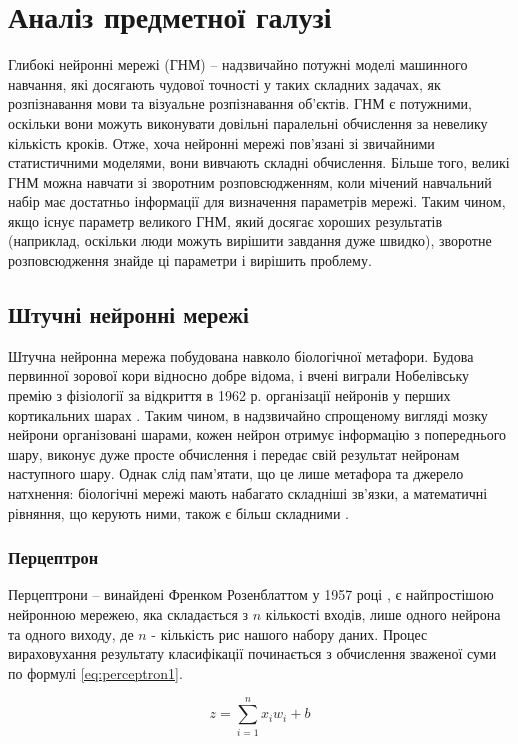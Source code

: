 \documentclass[a4paper,14pt]{extreport}
\begin{document}
\section{Аналіз предметної галузі}
Глибокі нейронні мережі (ГНМ) -- надзвичайно потужні моделі машинного навчання,
які досягають чудової точності у таких складних задачах, як
розпізнавання мови та візуальне розпізнавання об’єктів.
ГНМ є потужними, оскільки вони можуть виконувати
довільні паралельні обчислення за невелику кількість кроків.
Отже, хоча нейронні мережі пов’язані
зі звичайними статистичними моделями, вони вивчають складні
обчислення. Більше того, великі ГНМ можна навчати зі
зворотним розповсюдженням, коли мічений навчальний набір має
достатньо інформації для визначення параметрів мережі. Таким
чином, якщо існує параметр великого ГНМ, який досягає хороших
результатів (наприклад, оскільки люди можуть вирішити завдання
дуже швидко), зворотне розповсюдження знайде ці
параметри і вирішить проблему.

\subsection{Штучні нейронні мережі}
Штучна нейронна мережа побудована навколо біологічної метафори.
Будова первинної зорової кори відносно добре відома,
і вчені виграли Нобелівську премію з фізіології за відкриття в
1962 р. організації нейронів у перших кортикальних
шарах \cite{cortex-stuff}. Таким чином, в надзвичайно
спрощеному вигляді
мозку нейрони організовані шарами, кожен нейрон отримує
інформацію з попереднього шару, виконує дуже просте
обчислення і передає свій результат нейронам наступного
шару. Однак слід пам’ятати, що це лише метафора та джерело
натхнення: біологічні мережі мають набагато складніші
зв’язки, а математичні рівняння, що керують ними, також
є більш складними \cite{cortex-equations}.

\subsubsection{Перцептрон}
Перцептрони -- винайдені Френком Розенблаттом у 1957 році
\cite{rozenblatt}, є найпростішою
нейронною мережею, яка складається з $n$ кількості входів, лише одного
нейрона та одного виходу, де $n$ - кількість рис нашого набору
даних. Процес вираховухання результату класифікації починається
з обчислення зваженої суми
по формулі \ref{eq:perceptron1}.

\begin{equation}
    z = \sum^n_{i=1} x_i w_i + b
    \label{eq:perceptron1}
\end{equation}
\end{document}
